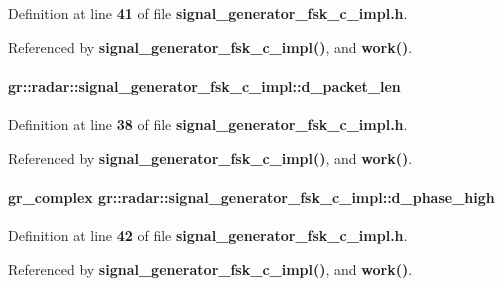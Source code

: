 Definition at line {\bf 41} of file {\bf signal\+\_\+generator\+\_\+fsk\+\_\+c\+\_\+impl.\+h}.



Referenced by {\bf signal\+\_\+generator\+\_\+fsk\+\_\+c\+\_\+impl()}, and {\bf work()}.

\paragraph[{d\+\_\+packet\+\_\+len}]{ gr\+::radar\+::signal\+\_\+generator\+\_\+fsk\+\_\+c\+\_\+impl\+::d\+\_\+packet\+\_\+len}\label{classgr_1_1radar_1_1signal__generator__fsk__c__impl_a3ebde234e8529744e37ddcfd9ad0b102}


Definition at line {\bf 38} of file {\bf signal\+\_\+generator\+\_\+fsk\+\_\+c\+\_\+impl.\+h}.



Referenced by {\bf signal\+\_\+generator\+\_\+fsk\+\_\+c\+\_\+impl()}, and {\bf work()}.

\paragraph[{d\+\_\+phase\+\_\+high}]{\setlength{\rightskip}{0pt plus 5cm}gr\+\_\+complex gr\+::radar\+::signal\+\_\+generator\+\_\+fsk\+\_\+c\+\_\+impl\+::d\+\_\+phase\+\_\+high}\label{classgr_1_1radar_1_1signal__generator__fsk__c__impl_ac4a3a24c733101fb38ec593e2ea8e3f9}


Definition at line {\bf 42} of file {\bf signal\+\_\+generator\+\_\+fsk\+\_\+c\+\_\+impl.\+h}.



Referenced by {\bf signal\+\_\+generator\+\_\+fsk\+\_\+c\+\_\+impl()}, and {\bf work()}.

